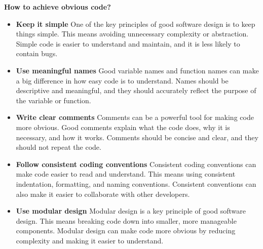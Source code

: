 \newpage 
{}

\textbf{How to achieve obvious code?}\newline
{
\begin{itemize}
	
\item \textbf{Keep it simple}\newline
	 One of the key principles of good software design is to keep things simple. This means avoiding unnecessary complexity or abstraction. Simple code is easier to understand and maintain, and it is less likely to contain bugs.\newline
\item \textbf{Use meaningful names}\newline
	 Good variable names and function names can make a big difference in how easy code is to understand. Names should be descriptive and meaningful, and they should accurately reflect the purpose of the variable or function.\newline
\newpage
\item \textbf{Write clear comments}\newline
 Comments can be a powerful tool for making code more obvious. Good comments explain what the code does, why it is necessary, and how it works. Comments should be concise and clear, and they should not repeat the code.\newline
\item \textbf{Follow consistent coding conventions}\newline
Consistent coding conventions can make code easier to read and understand. This means using consistent indentation, formatting, and naming conventions. Consistent conventions can also make it easier to collaborate with other developers.\newline
\newpage
\item \textbf{Use modular design}\newline
Modular design is a key principle of good software design. This means breaking code down into smaller, more manageable components. Modular design can make code more obvious by reducing complexity and making it easier to understand.\cite{Zhou:2018} \newline
	
\end{itemize}

}

